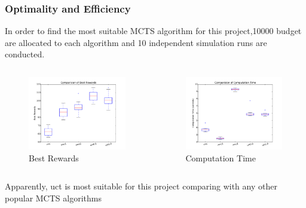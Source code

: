 \documentclass[compress]{beamer}
\begin{document}
\begin{frame}
\frametitle{Optimality and Efficiency}
In order to find the most suitable MCTS algorithm for this project,10000 budget are allocated to each algorithm and 10 independent simulation runs are conducted.
\begin{columns}
\begin{figure}[htbp!]
\centering
\includegraphics[width=1.0\textwidth]{best_reward_compare.pdf}
\caption{\label{fig:optimality}Best Rewards}
\end{figure}
\begin{figure}[htbp!]
\centering
\includegraphics[width=1.0\textwidth]{computation_time_compare.pdf}
\caption{\label{fig:computation_time}Computation Time}
\end{figure}
\end{columns}
Apparently, uct is most suitable for this project comparing with any other popular MCTS algorithms 
\end{frame}
\end{document}
